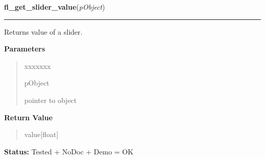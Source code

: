\hspace{.8\funcindent}\begin{boxedminipage}{\funcwidth}

    \raggedright \textbf{fl\_get\_slider\_value}(\textit{pObject})

    \vspace{-1.5ex}

    \rule{\textwidth}{0.5\fboxrule}
\setlength{\parskip}{2ex}
    Returns value of a slider.

\setlength{\parskip}{1ex}
      \textbf{Parameters}
      \vspace{-1ex}

      \begin{quote}
        \begin{Ventry}{xxxxxxx}

          \item[pObject]

          pointer to object

        \end{Ventry}

      \end{quote}

      \textbf{Return Value}
    \vspace{-1ex}

      \begin{quote}
      value[float]

      \end{quote}

\textbf{Status:} Tested + NoDoc + Demo = OK



    \end{boxedminipage}

    \label{xformslib:library:fl_set_slider_bounds}

    \vspace{0.5ex}

